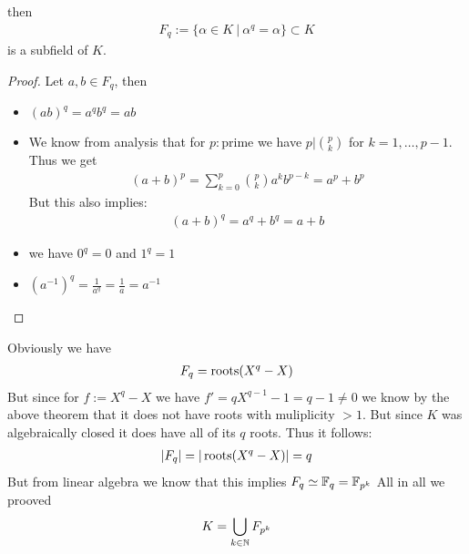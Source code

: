 \documentclass[]{article}
\begin{document}
\begin{theorem*}
    then 
    \begin{align*}
        F_q:=\{\alpha \in K \ | \ \alpha^q = \alpha\} \subset K
    \end{align*}
    is a subfield of \(K\).
\end{theorem*}
\begin{proof}
    Let \(a,b \in F_q\), then 
    \begin{itemize}
        \item \((ab)^q=a^qb^q=ab\)
        \item We know from analysis that for \(p:\text{prime}\) we have \(p | \binom{p}{k}\) for \(k=1, \dots, p-1\). Thus we get
        \begin{align*}
            (a+b)^p = \sum_{k=0}^{p}\binom{p}{k}a^k b^{p-k} = a^p + b^p
        \end{align*}
        But this also implies:
        \begin{align*}
            (a+b)^q=a^q+b^q = a+b
        \end{align*}
        \item we have \(0^q=0\) and \(1^q=1\)
        \item \((a^{-1})^q=\frac{1}{a^q}=\frac{1}{a}=a^{-1}\)
    \end{itemize}
\end{proof}

Obviously we have
\begin{align*}
    F_q = \operatorname{roots}(X^q-X)
\end{align*}
But since for \(f:=X^q-X\) we have \(f'=qX^{q-1}-1=q-1 \neq 0\) we know by the above theorem that it does not have roots with muliplicity \(>1\).
But since \(K\) was algebraically closed it does have all of its \(q\) roots. Thus it follows:
\begin{align*}
    |F_q|=|\operatorname{roots}(X^q-X)|=q
\end{align*}
But from linear algebra we know that this implies \(F_q \simeq  {\mathbb{F}}_q = {\mathbb{F}}_{p^k}\)
All in all we prooved
\begin{align*}
    K =\bigcup_{k \in {\mathbb{N}}} F_{p^k}
\end{align*}
\end{document}
